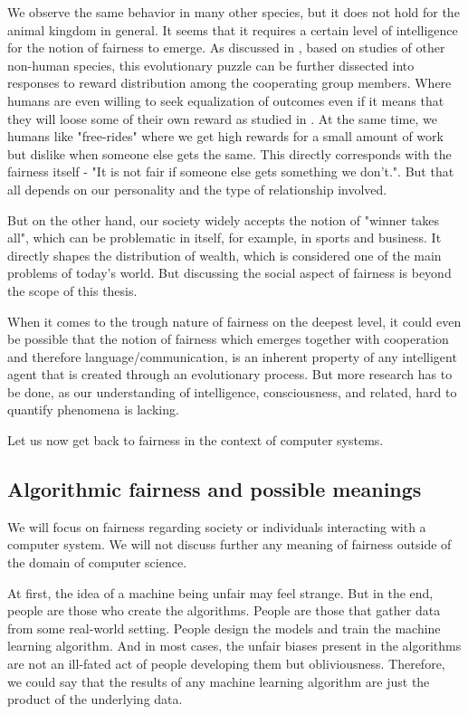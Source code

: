We observe the same behavior in many other species, but it does not hold for the animal kingdom in general. It seems that it requires a certain level of intelligence for the notion of fairness to emerge. As discussed in \cite{brosnan2014evolution}, based on studies of other non-human species, this evolutionary puzzle can be further dissected into responses to reward distribution among the cooperating group members. Where humans are even willing to seek equalization of outcomes even if it means that they will loose some of their own reward as studied in \cite{willing_to_pay_to_equality}. At the same time, we humans like "free-rides" where we get high rewards for a small amount of work but dislike when someone else gets the same. This directly corresponds with the fairness itself - "It is not fair if someone else gets something we don't.". But that all depends on our personality and the type of relationship involved.

But on the other hand, our society widely accepts the notion of "winner takes all", which can be problematic in itself, for example, in sports and business. It directly shapes the distribution of wealth, which is considered one of the main problems of today's world. But discussing the social aspect of fairness is beyond the scope of this thesis.


When it comes to the trough nature of fairness on the deepest level, it could even be possible that the notion of fairness which emerges together with cooperation and therefore language/communication, is an inherent property of any intelligent agent that is created through an evolutionary process. But more research has to be done, as our understanding of intelligence, consciousness, and related, hard to quantify phenomena is lacking.\newline

Let us now get back to fairness in the context of computer systems.


\subsection{Algorithmic fairness and possible meanings}\label{subsec:02_general.algorithmic_fairness_and_possible_meanings}
We will focus on fairness regarding society or individuals interacting with a computer system. We will not discuss further any meaning of fairness outside of the domain of computer science.

At first, the idea of a machine being unfair may feel strange. But in the end, people are those who create the algorithms. People are those that gather data from some real-world setting. People design the models and train the machine learning algorithm. And in most cases, the unfair biases present in the algorithms are not an ill-fated act of people developing them but obliviousness. Therefore, we could say that the results of any machine learning algorithm are just the product of the underlying data.

